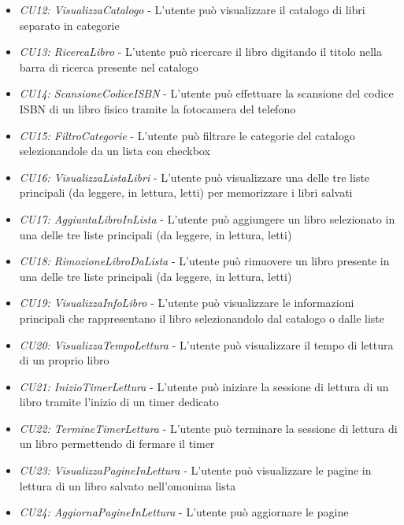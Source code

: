 \documentclass{article}
\begin{document}
\begin{itemize}[label=\textendash]
    \item \textit{CU12: VisualizzaCatalogo} - L'utente può visualizzare il catalogo di libri separato in categorie
    \item \textit{CU13: RicercaLibro} - L'utente può ricercare il libro digitando il titolo nella barra di ricerca presente nel catalogo
    \item \textit{CU14: ScansioneCodiceISBN} - L'utente può effettuare la scansione del codice ISBN di un libro fisico tramite la fotocamera del telefono
    \item \textit{CU15: FiltroCategorie} - L'utente può filtrare le categorie del catalogo selezionandole da un lista con checkbox
    \item \textit{CU16: VisualizzaListaLibri} - L'utente può visualizzare una delle tre liste principali (da leggere, in lettura, letti) per memorizzare i libri salvati
    \item \textit{CU17: AggiuntaLibroInLista} - L'utente può aggiungere un libro selezionato in una delle tre liste principali (da leggere, in lettura, letti)
    \item \textit{CU18: RimozioneLibroDaLista} - L'utente può rimuovere un libro presente in una delle tre liste principali (da leggere, in lettura, letti)
    \item \textit{CU19: VisualizzaInfoLibro} - L'utente può visualizzare le informazioni principali che rappresentano il libro selezionandolo dal catalogo o dalle liste
    \item \textit{CU20: VisualizzaTempoLettura} - L'utente può visualizzare il tempo di lettura di un proprio libro
    \item \textit{CU21: InizioTimerLettura} - L'utente può iniziare la sessione di lettura di un libro tramite l'inizio di un timer dedicato
    \item \textit{CU22: TermineTimerLettura} - L'utente può terminare la sessione di lettura di un libro permettendo di fermare il timer
    \item \textit{CU23: VisualizzaPagineInLettura} - L'utente può visualizzare le pagine in lettura di un libro salvato nell'omonima lista
    \item \textit{CU24: AggiornaPagineInLettura} - L'utente può aggiornare le pagine 
\end{itemize}
\end{document}
